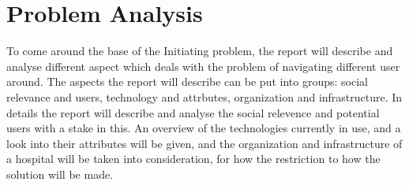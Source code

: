 \chapter{Problem Analysis} \label{cha:problem_analysis}

To come around the base of the Initiating problem, the report will describe and analyse different aspect which deals with the problem of navigating different user around. The aspects the report will describe can be put into groups: social relevance and users, technology and attrbutes, organization and infrastructure. In details the report will describe and analyse the social relevence and potential users with a stake in this. An overview of the technologies currently in use, and a look into their attributes will be given, and the organization and infrastructure of a hospital will be taken into consideration, for how the restriction to how the solution will be made. 










